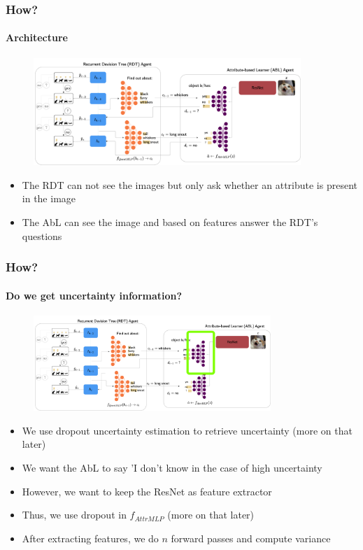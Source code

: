 \documentclass[9pt]{beamer}
\begin{document}
\begin{frame}
\frametitle{How?}
\framesubtitle{Architecture}
\begin{figure}
	\centering
	\includegraphics[width=0.9\textwidth]{images/uncertaintRDTC.pdf} 
	\label{fig:uncertainRDTC}
\end{figure}
\begin{itemize}
	\item The RDT can not see the images but only ask whether an attribute is present in the image
	\item The AbL can see the image and based on features answer the RDT's questions
\end{itemize}
\end{frame} 


\begin{frame}
\frametitle{How?}
\framesubtitle{Do we get uncertainty information?}\begin{figure}
	\centering
	\includegraphics[width=0.8\textwidth]{images/where_is_uncertainty.pdf} 
\end{figure}
\begin{itemize}
	\item We use dropout uncertainty estimation to retrieve uncertainty (more on that later)
	\item We want the AbL to say 'I don't know in the case of high uncertainty
	\item However, we want to keep the ResNet as feature extractor
	\item Thus, we use dropout in $f_{AttrMLP}$ (more on that later)
	\item After extracting features, we do $n$ forward passes and compute variance
\end{itemize}
\end{frame}
\end{document}
